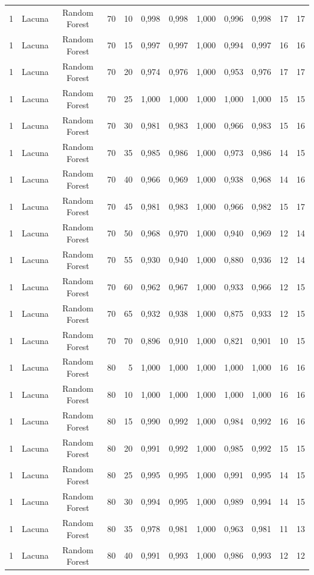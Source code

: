 \begin{longtable}{ccclrrrrrrrr}
1 & Lacuna & Random Forest & 70 & 10 & 0,998 & 0,998 & 1,000 & 0,996 & 0,998 & 17 & 17 \\
1 & Lacuna & Random Forest & 70 & 15 & 0,997 & 0,997 & 1,000 & 0,994 & 0,997 & 16 & 16 \\
1 & Lacuna & Random Forest & 70 & 20 & 0,974 & 0,976 & 1,000 & 0,953 & 0,976 & 17 & 17 \\
1 & Lacuna & Random Forest & 70 & 25 & 1,000 & 1,000 & 1,000 & 1,000 & 1,000 & 15 & 15 \\
1 & Lacuna & Random Forest & 70 & 30 & 0,981 & 0,983 & 1,000 & 0,966 & 0,983 & 15 & 16 \\
1 & Lacuna & Random Forest & 70 & 35 & 0,985 & 0,986 & 1,000 & 0,973 & 0,986 & 14 & 15 \\
1 & Lacuna & Random Forest & 70 & 40 & 0,966 & 0,969 & 1,000 & 0,938 & 0,968 & 14 & 16 \\
1 & Lacuna & Random Forest & 70 & 45 & 0,981 & 0,983 & 1,000 & 0,966 & 0,982 & 15 & 17 \\
1 & Lacuna & Random Forest & 70 & 50 & 0,968 & 0,970 & 1,000 & 0,940 & 0,969 & 12 & 14 \\
1 & Lacuna & Random Forest & 70 & 55 & 0,930 & 0,940 & 1,000 & 0,880 & 0,936 & 12 & 14 \\
1 & Lacuna & Random Forest & 70 & 60 & 0,962 & 0,967 & 1,000 & 0,933 & 0,966 & 12 & 15 \\
1 & Lacuna & Random Forest & 70 & 65 & 0,932 & 0,938 & 1,000 & 0,875 & 0,933 & 12 & 15 \\
1 & Lacuna & Random Forest & 70 & 70 & 0,896 & 0,910 & 1,000 & 0,821 & 0,901 & 10 & 15 \\
1 & Lacuna & Random Forest & 80 & 5 & 1,000 & 1,000 & 1,000 & 1,000 & 1,000 & 16 & 16 \\
1 & Lacuna & Random Forest & 80 & 10 & 1,000 & 1,000 & 1,000 & 1,000 & 1,000 & 16 & 16 \\
1 & Lacuna & Random Forest & 80 & 15 & 0,990 & 0,992 & 1,000 & 0,984 & 0,992 & 16 & 16 \\
1 & Lacuna & Random Forest & 80 & 20 & 0,991 & 0,992 & 1,000 & 0,985 & 0,992 & 15 & 15 \\
1 & Lacuna & Random Forest & 80 & 25 & 0,995 & 0,995 & 1,000 & 0,991 & 0,995 & 14 & 15 \\
1 & Lacuna & Random Forest & 80 & 30 & 0,994 & 0,995 & 1,000 & 0,989 & 0,994 & 14 & 15 \\
1 & Lacuna & Random Forest & 80 & 35 & 0,978 & 0,981 & 1,000 & 0,963 & 0,981 & 11 & 13 \\
1 & Lacuna & Random Forest & 80 & 40 & 0,991 & 0,993 & 1,000 & 0,986 & 0,993 & 12 & 12 \\

\end{longtable}
